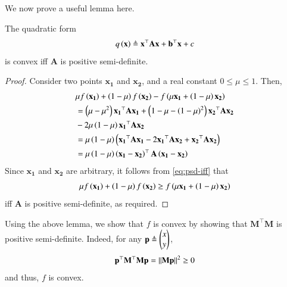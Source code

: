 \documentclass[journal,12pt,twocolumn]{IEEEtran}
\renewcommand{\vec}[1]{\boldsymbol{\mathbf{#1}}}
\begin{document}
\begin{enumerate}
    We now prove a useful lemma here.
    \begin{lemma}
        The quadratic form
        \begin{align}
            q\brak{\vec{x}} \triangleq \vec{x}^\top\vec{Ax} + \vec{b}^\top\vec{x} + c
            \label{eq:quad-x}
        \end{align}
        is convex iff $\vec{A}$ is positive semi-definite.
    \end{lemma}
    \begin{proof}
        Consider two points $\vec{x_1}$ and $\vec{x_2}$, and a real constant
        $0 \le \mu \le 1$. Then,
        \begin{align}
            &\mu f\brak{\vec{x_1}} + \brak{1-\mu}f\brak{\vec{x_2}} - f\brak{\mu\vec{x_1}+\brak{1-\mu}\vec{x_2}} \nonumber \\
            &= \brak{\mu-\mu^2}\vec{x_1}^\top\vec{Ax_1} + \brak{1-\mu-\brak{1-\mu}^2}\vec{x_2}^\top\vec{Ax_2} \nonumber \\
            &- 2\mu\brak{1-\mu}\vec{x_1}^\top\vec{Ax_2} \\
            &= \mu\brak{1-\mu}\brak{\vec{x_1}^\top\vec{Ax_1}-2\vec{x_1}^\top\vec{Ax_2}+\vec{x_2}^\top\vec{Ax_2}} \\
            &= \mu\brak{1-\mu}\brak{\vec{x_1}-\vec{x_2}}^\top\vec{A}\brak{\vec{x_1}-\vec{x_2}}
            \label{eq:psd-iff}
        \end{align}
        Since $\vec{x_1}$ and $\vec{x_2}$ are arbitrary, it follows from 
        \eqref{eq:psd-iff} that
        \begin{align}
            \mu f\brak{\vec{x_1}} + \brak{1-\mu}f\brak{\vec{x_2}} \ge f\brak{\mu\vec{x_1}+\brak{1-\mu}\vec{x_2}}
        \end{align}
        iff $\vec{A}$ is positive semi-definite, as required.
    \end{proof}
    Using the above lemma, we show that $f$ is convex by showing that 
    $\vec{M}^\top\vec{M}$ is positive semi-definite. Indeed, for any 
    $\vec{p} \triangleq \myvec{x\\y}$,
    \begin{align}
        \vec{p}^\top\vec{M}^\top\vec{Mp} = \norm{\vec{Mp}}^2 \ge 0
        \label{eq:psd}
    \end{align}
    and thus, $f$ is convex.


\end{enumerate}
\end{document}
